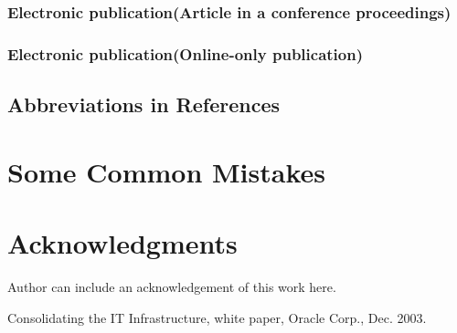\documentclass[11pt, onecolumn, twoside, a4paper]{article}
\begin{document}
\subsubsection{Electronic publication(Article in a conference proceedings)}
\subsubsection{Electronic publication(Online-only publication)}
\subsection{Abbreviations in References}





\section{Some Common Mistakes}



\section*{Acknowledgments}

Author can include an acknowledgement of this work here. 


\begin{thebibliography}{9}

 Consolidating the IT Infrastructure, white paper, Oracle Corp., Dec. 2003.
\end{thebibliography}
\end{document}
